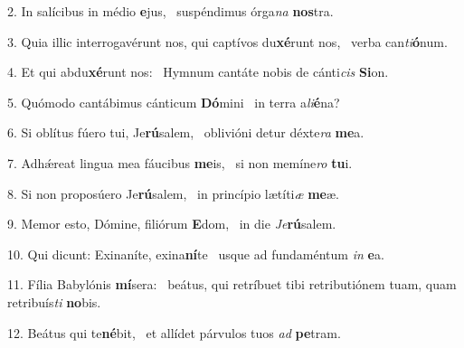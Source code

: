 2. In salícibus in médio \textbf{e}jus, \ast\  suspéndimus órga\textit{na} \textbf{nos}tra.\

3. Quia illic interrogavérunt nos, qui captívos du\textbf{xé}runt nos, \ast\  verba can\textit{ti}\textbf{ó}num.\

4. Et qui abdu\textbf{xé}runt nos: \ast\  Hymnum cantáte nobis de cánti\textit{cis} \textbf{Si}on.\

5. Quómodo cantábimus cánticum \textbf{Dó}mini \ast\  in terra a\textit{li}\textbf{é}na?\

6. Si oblítus fúero tui, Je\textbf{rú}salem, \ast\  oblivióni detur déxte\textit{ra} \textbf{me}a.\

7. Adhǽreat lingua mea fáucibus \textbf{me}is, \ast\  si non memíne\textit{ro} \textbf{tu}i.\

8. Si non proposúero Je\textbf{rú}salem, \ast\  in princípio lætíti\textit{æ} \textbf{me}æ.\

9. Memor esto, Dómine, filiórum \textbf{E}dom, \ast\  in die \textit{Je}\textbf{rú}salem.\

10. Qui dicunt: Exinaníte, exina\textbf{ní}te \ast\  usque ad fundaméntum \textit{in} \textbf{e}a.\

11. Fília Babylónis \textbf{mí}sera: \ast\  beátus, qui retríbuet tibi retributiónem tuam, quam retribuís\textit{ti} \textbf{no}bis.\

12. Beátus qui te\textbf{né}bit, \ast\  et allídet párvulos tuos \textit{ad} \textbf{pe}tram.\

